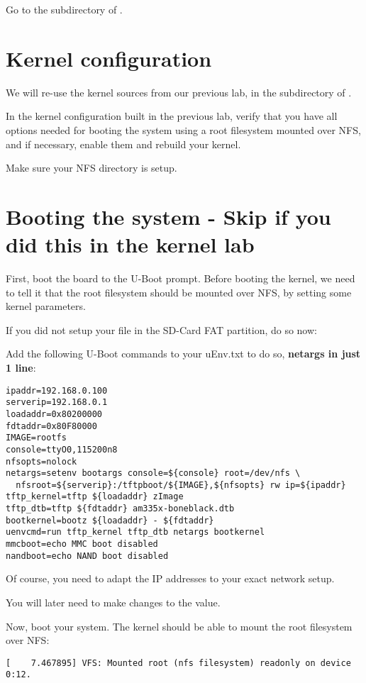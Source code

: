 Go to the  subdirectory of \labdir.

\section{Kernel configuration}

We will re-use the kernel sources from our previous lab, in
the  subdirectory of \labdir.

In the kernel configuration built in the previous lab, verify that you
have all options needed for booting the system using a root filesystem
mounted over NFS, and if necessary, enable them and rebuild your
kernel.

Make sure your NFS directory is setup.
\clearpage
\section{Booting the system - Skip if you did this in the kernel lab}

First, boot the board to the U-Boot prompt. Before booting the kernel,
we need to tell it that the root filesystem should be mounted over
NFS, by setting some kernel parameters.

If you did not setup your  file in the SD-Card FAT partition,
do so now:

Add the following U-Boot commands to your uEnv.txt to do so, {\bf netargs in just 1 line}:

\begin{verbatim}
ipaddr=192.168.0.100
serverip=192.168.0.1
loadaddr=0x80200000
fdtaddr=0x80F80000
IMAGE=rootfs
console=ttyO0,115200n8
nfsopts=nolock
netargs=setenv bootargs console=${console} root=/dev/nfs \
  nfsroot=${serverip}:/tftpboot/${IMAGE},${nfsopts} rw ip=${ipaddr}
tftp_kernel=tftp ${loadaddr} zImage
tftp_dtb=tftp ${fdtaddr} am335x-boneblack.dtb
bootkernel=bootz ${loadaddr} - ${fdtaddr}
uenvcmd=run tftp_kernel tftp_dtb netargs bootkernel
mmcboot=echo MMC boot disabled
nandboot=echo NAND boot disabled
\end{verbatim}

Of course, you need to adapt the IP addresses to your exact network
setup.

You will later need to make changes to the  value.

Now, boot your system. The kernel should be able to mount the root
filesystem over NFS:

\begin{verbatim}
[    7.467895] VFS: Mounted root (nfs filesystem) readonly on device 0:12.
\end{verbatim}

